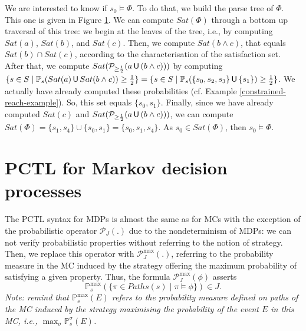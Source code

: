 \begin{example}
\begin{figure}[H]
\begin{minipage}{0.6\linewidth}
    \captionsetup{justification=centering}
    \label{parse-tree-example}
  \end{minipage}
  \end{figure}
  \noindent We are interested to know if $s_0 \models \Phi$. To do that, we build the parse tree of $\Phi$.
  This one is given in Figure \ref{parse-tree-example}. We can compute $Sat(\Phi)$ through a bottom up traversal of this tree: we begin at the leaves of the tree, i.e., by computing $Sat(a)$, $Sat(b)$, and $Sat(c)$. Then, we compute $Sat(b \wedge c)$, that equals $Sat(b)\cap Sat(c)$, according to the characterisation of the satisfaction set.
  After that, we compute
  $Sat(\mathcal{P}_{\geq \frac{1}{2}}(a \,\text{\sffamily U}\, (b \wedge c)))$ by computing $\{ s \in S \; | \; \mathbb{P}_s(Sat(a) \,\text{\sffamily U}\, Sat(b \wedge c)) \geq \frac{1}{2}\} = \{ s \in S \; | \; \mathbb{P}_s(\{s_0, s_2, s_3\} \,\text{\sffamily U}\, \{s_1\}) \geq \frac{1}{2}\}$.
  We actually have already computed these probabilities (cf. Example \ref{constrained-reach-example}).
  So, this set equals $\{ s_0, s_1 \}$.
  Finally, since we have already computed $Sat(c)$ and $Sat(\mathcal{P}_{\geq \frac{1}{2}}(a \,\text{\sffamily U}\, (b \wedge c)))$, we can compute $Sat(\Phi) = \{s_1, s_4\} \cup \{s_0, s_1\} = \{s_0, s_1, s_4\}$.
  As $s_0 \in Sat(\Phi)$, then $s_0 \models \Phi$.
\end{example}

\section{PCTL for Markov decision processes}
The PCTL syntax for MDPs is almost the same as for MCs with the exception of the probabilistic operator $\mathcal{P}_J(.)$ due to the nondeterminism of MDPs:
we can not verify probabilistic properties without referring to the notion of strategy.
Then, we replace this operator with $\mathcal{P}^{\max}_J(.)$, referring to the probability measure in the MC induced by the strategy offering the maximum probability of satisfying a given property.
Thus, the formula $\mathcal{P}^{\max}_J(\phi)$ asserts \[\mathbb{P}^{\max}_s(\{\pi \in Paths(s) \; | \; \pi \models \phi \}) \in J .\]
\textit{Note: remind that $\mathbb{P}_s^{\max}(E)$ refers to the probability measure defined on paths of the MC induced by the strategy maximising the probability of the event $E$ in this MC, i.e., $\max_{\sigma} \mathbb{P}_s^\sigma(E)$.}

